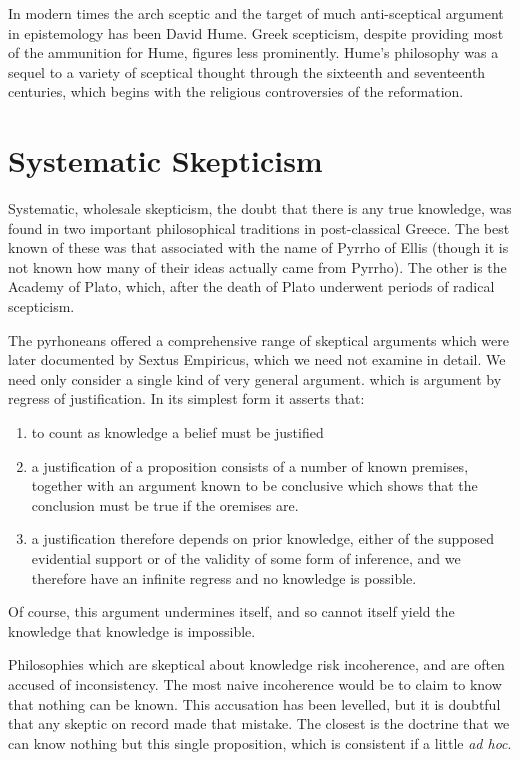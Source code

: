 In modern times the arch sceptic and the target of much anti-sceptical
argument in epistemology has been David Hume. 
Greek scepticism, despite providing most of the ammunition for Hume,
figures less prominently. 
Hume's philosophy was a sequel to a variety of sceptical thought through
the sixteenth and seventeenth centuries, which begins with the
religious controversies of the reformation.  

\section{Systematic Skepticism}

Systematic, wholesale skepticism, the doubt that there is any
true knowledge, was found in two important philosophical traditions
in post-classical Greece.
The best known of these was that associated with the name of Pyrrho of
Ellis (though it is not known how many of their ideas actually came from Pyrrho).
The other is the Academy of Plato, which, after the  death of Plato
underwent periods of radical scepticism.

The pyrhoneans offered a comprehensive range of skeptical arguments which were later documented by Sextus Empiricus, which we need not examine in detail.
We need only consider a single kind of very general argument. which is argument by regress of justification.
In its simplest form it asserts that:

\begin{enumerate}
\item to count as knowledge a belief must be justified
\item a justification of a proposition consists of a number of known premises, together with an argument known to be conclusive which shows that the conclusion must be true if the oremises are.
\item a justification therefore depends on prior knowledge, either of the supposed evidential support or of the validity of some form of inference, and we therefore have an infinite regress and no knowledge is possible.
\end{enumerate}

Of course, this argument undermines itself, and so cannot itself yield the knowledge that knowledge is impossible.


Philosophies which are skeptical about knowledge risk incoherence, and are often accused of inconsistency.
The most naive incoherence would be to claim to know that nothing can be known.
This accusation has been levelled, but it is doubtful that any skeptic on record made that mistake.
The closest is the doctrine that we can know nothing but this single proposition, which is consistent if a little {\it ad hoc}.

